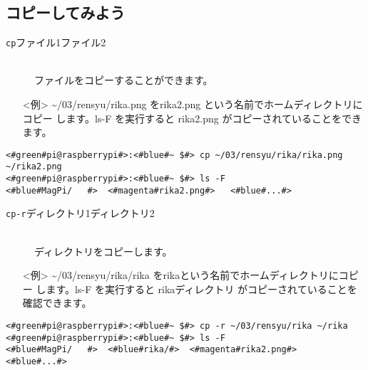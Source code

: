 \newpage
\subsection{コピーしてみよう}
\begin{description}
\item[\texttt{cp}\textvisiblespace ファイル1\textvisiblespace ファイル2]\mbox{}\\
ファイルをコピーすることができます。
\end{description}
\begin{itemize}
\item[<例>]\textasciitilde /03/rensyu/rika.png をrika2.png という名前でホームディレクトリにコピー
します。ls\textvisiblespace -F を実行すると rika2.png がコピーされていることをできます。
\end{itemize}
\begin{lstlisting}[caption=cpの例, label=cp]
<#green#pi@raspberrypi#>:<#blue#~ $#> cp ~/03/rensyu/rika/rika.png ~/rika2.png
<#green#pi@raspberrypi#>:<#blue#~ $#> ls -F
<#blue#MagPi/	#>	<#magenta#rika2.png#>	<#blue#...#>
\end{lstlisting}
\begin{description}
\item[\texttt{cp}\textvisiblespace \texttt{-r}\textvisiblespace ディレクトリ1\textvisiblespace ディレクトリ2]\mbox{}\\
ディレクトリをコピーします。
\end{description}
\begin{itemize}
\item[<例>]\textasciitilde /03/rensyu/rika/rika をrikaという名前でホームディレクトリにコピー
します。ls\textvisiblespace -F を実行すると rikaディレクトリ がコピーされていることを確認できます。
\end{itemize}
\begin{lstlisting}[caption=cp -rの例, label=cp-R]
<#green#pi@raspberrypi#>:<#blue#~ $#> cp -r ~/03/rensyu/rika ~/rika
<#green#pi@raspberrypi#>:<#blue#~ $#> ls -F
<#blue#MagPi/	#>	<#blue#rika/#>	<#magenta#rika2.png#>	<#blue#...#>
\end{lstlisting}
\begin{tcolorbox}[title=\useOmetoi]
\begin{enumerate}
\end{enumerate}
\end{tcolorbox}
